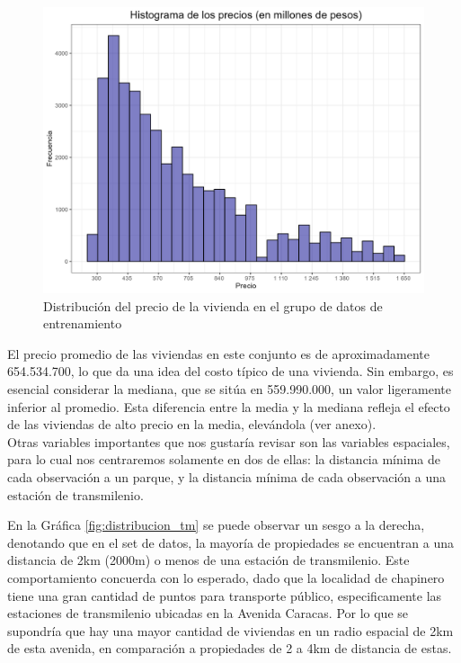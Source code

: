 \documentclass[12pt]{article}
\begin{document}
\begin{figure}[H]
\centering
\includegraphics[scale=0.8]{../views/graficas_descriptivas/histograma_precio.png}
\centering
\caption{Distribución del precio de la vivienda en el grupo de datos de entrenamiento}
\label{fig:distribucion}
\end{figure}

El precio promedio de las viviendas en este conjunto es de aproximadamente 654.534.700, lo que da una idea del costo típico de una vivienda. Sin embargo, es esencial considerar la mediana, que se sitúa en 559.990.000, un valor ligeramente inferior al promedio. Esta diferencia entre la media y la mediana refleja el efecto de las viviendas de alto precio en la media, elevándola (ver anexo). \\

Otras variables importantes que nos gustaría revisar son las variables espaciales, para lo cual nos centraremos solamente en dos de ellas: la distancia mínima de cada observación a un parque, y la distancia mínima de cada observación a una estación de transmilenio. 

En la Gráfica \ref{fig:distribucion_tm} se puede observar un sesgo a la derecha, denotando que en el set de datos, la mayoría de propiedades se encuentran a una distancia de 2km (2000m) o menos de una estación de transmilenio. Este comportamiento concuerda con lo esperado, dado que la localidad de chapinero tiene una gran cantidad de puntos para transporte público, especificamente las estaciones de transmilenio ubicadas en la Avenida Caracas. Por lo que se supondría que hay una mayor cantidad de viviendas en un radio espacial de 2km de esta avenida, en comparación a propiedades de 2 a 4km de distancia de estas.\\
\end{document}

